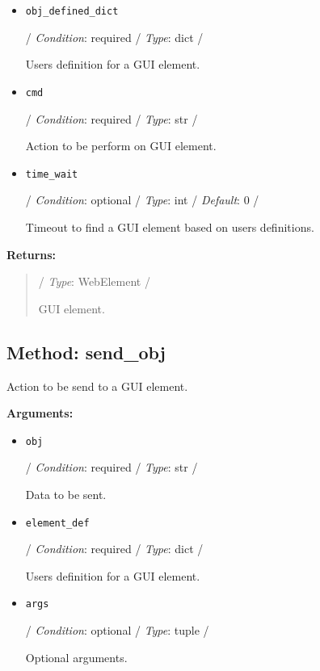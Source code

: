 \begin{itemize}
\item
  \texttt{obj\_defined\_dict}

  / \emph{Condition}: required / \emph{Type}: dict /

  User\textquotesingle s definition for a GUI element.
\item
  \texttt{cmd}

  / \emph{Condition}: required / \emph{Type}: str /

  Action to be perform on GUI element.
\item
  \texttt{time\_wait}

  / \emph{Condition}: optional / \emph{Type}: int / \emph{Default}: 0 /

  Timeout to find a GUI element based on user\textquotesingle s
  definitions.
\end{itemize}

\textbf{Returns:}

\begin{quote}
/ \emph{Type}: WebElement /

GUI element.
\end{quote}

\hypertarget{qconnectwinapp-winappdriver-winapp-client-winappclient-send-obj}{%
\subsection{Method: send\_obj}\label{qconnectwinapp-winappdriver-winapp-client-winappclient-send-obj}}

Action to be send to a GUI element.

\textbf{Arguments:}

\begin{itemize}
\item
  \texttt{obj}

  / \emph{Condition}: required / \emph{Type}: str /

  Data to be sent.
\item
  \texttt{element\_def}

  / \emph{Condition}: required / \emph{Type}: dict /

  User\textquotesingle s definition for a GUI element.
\item
  \texttt{args}

  / \emph{Condition}: optional / \emph{Type}: tuple /

  Optional arguments.
\end{itemize}

